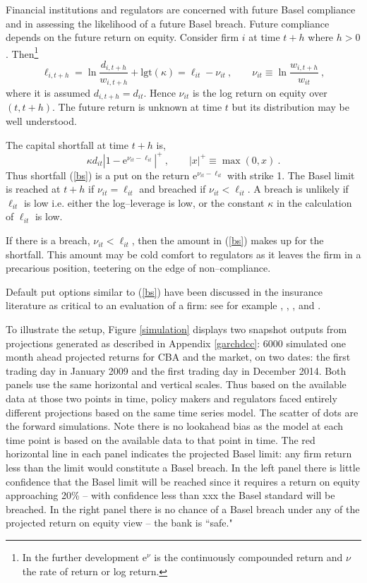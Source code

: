 \documentclass[authoryear]{elsarticle}
\newcommand{\logit}{\mathrm{lgt}}
\newcommand{\e}{\mathrm{e}}
\newcommand{\eref}[1]{(\ref{#1})}
\newcommand{\fref}[1]{Figure \ref{#1}}
\newcommand{\aref}[1]{Appendix \ref{#1}}
\newcommand{\cq}{\ , \qquad}
\newcommand{\be}[1]{\begin{equation}\label{#1}}
\newcommand{\ee}{\end{equation}}
\begin{document}
Financial institutions and regulators are concerned with future Basel compliance and in assessing  the likelihood of a  future Basel breach.   Future compliance depends on the future return on equity.   Consider  firm $i$ at time  $t+h$ where $h>0$.  Then\footnote{In the further development $\e^\nu$ is the continuously compounded return and $\nu$  the  rate of return or log return.}
$$
\ell_{i,t+h} = \ln \frac{d_{i,t+h}}{w_{i,t+h}} +\logit(\kappa)= \ell_{it} -\nu_{it}\cq \nu_{it}\equiv \ln\frac{w_{i,t+h}}{w_{it}}  \ ,
$$
where it is assumed $d_{i,t+h}=d_{it}$.  Hence $\nu_{it}$ is the log return on equity over $(t,t+h)$.  The future return is unknown at time $t$ but its distribution may be  well understood.

The capital  shortfall  at time $t+h$ is,
\be{bs}
\kappa d_{it} |1-\e^{\nu_{it}-\ell_{it}}|^+\cq  |x|^+\equiv \max(0,x)\ . 
\ee
Thus shortfall \eref{bs} is a put on the return $\e^{\nu_{it}-\ell_{it}}$  with strike 1.  
The Basel  limit is reached at $t+h$ if $\nu_{it}=\ell_{it}$ and  breached  if
$\nu_{it}< \ell_{it}$.
A breach is  unlikely if $\ell_{it}$ is low i.e. either the log--leverage is low, or the  constant $\kappa$ in the calculation of $\ell_{it}$ is low.


If there is a breach, $\nu_{it}<\ell_{it}$, then the amount in \eref{bs} makes up for the shortfall.   This amount may be cold comfort to regulators as it leaves the firm in a precarious position, teetering on the edge of non--compliance.

Default put options similar to \eref{bs} have been discussed in the insurance literature as critical to an evaluation of a firm:  see for
example \citet{merton1977analytic}, \citet{doherty1986price}, \citet{cummins1988risk}, \citet{myers2001capital} and \citet{sherris2006solvency}.

To illustrate the setup, \fref{simulation}   displays two snapshot outputs from projections generated as described  in \aref{garchdcc}:  6000  simulated one month ahead projected returns for  CBA and the market, on  two dates: the first trading day in January 2009 and the first trading day in December 2014.    Both panels use the same horizontal and vertical scales.   Thus based on the available data at those two points in  time, policy makers and regulators faced entirely different projections based on the same time series model.   The scatter of dots are the forward simulations.  Note there is no lookahead bias as the model at each time point is based on the available data to that point in time.    The red horizontal line in each panel indicates the projected Basel limit:  any firm return less than the limit would constitute a Basel breach.   In the left panel there is little confidence that the Basel limit will be reached since it requires a return on equity approaching 20\% -- with confidence less than xxx the Basel standard will be breached.  In the right panel there is no chance of a Basel breach under any of the projected return on equity view -- the bank is ``safe."  
 
\end{document}
